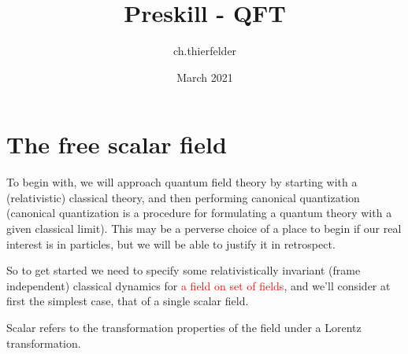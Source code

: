 \documentclass{article}
\title{Preskill - QFT}
\author{ch.thierfelder }
\date{March 2021}
\begin{document}
\maketitle

\section{The free scalar field}
To begin with, we will approach quantum field theory by starting with a (relativistic) classical theory, and then performing canonical quantization (canonical quantization is a procedure for formulating a quantum theory with a given classical limit). This may be a perverse choice of a place to begin if our real interest is in particles, but we will be able to justify it in retrospect.

So to get started we need to specify some relativistically invariant (frame independent) classical dynamics for \textcolor{red}{a field on set of fields}, and we'll consider at first the simplest case, that of a single scalar field.

Scalar refers to the transformation properties of the field under a Lorentz transformation.
\end{document}

